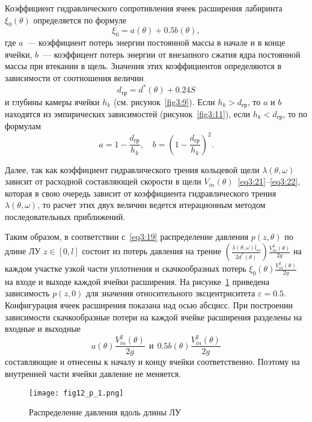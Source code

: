 Коэффициент гидравлического сопротивления ячеек расширения лабиринта $\xi_0 \left(\theta \right)$
определяется по формуле~\cite{idelchik}
\begin{equation}
  \xi _0  = a\left( \theta  \right) + 0.5b\left( \theta  \right),
  \label{eq3:23}
\end{equation}
где $a$~--- коэффициент потерь энергии постоянной массы в начале и в конце ячейки, 
$b$~--- коэффицент потерь энергии от внезапного сжатия ядра постоянной массы при втекании в щель.
Значения этих коэффициентов определяются в зависимости от соотношения величин
\begin{equation}
  d_{\text{гр}} = d^* \left(\theta \right)+0.24  S
  \label{eq3:24}
\end{equation}
и глубины камеры ячейки $h_k$ (см. рисунок~\ref{fig3:9}). Если $h_k>d_{\text{гр}}$, то $a$ и $b$ находятся 
из эмпирических зависимостей
(рисунок~\ref{fig3:11}), если $h_k<d_{\text{гр}}$, то по формулам
\begin{equation}
  a=1-\frac{d_{\text{гр}}}{h_k},\quad b=\left(1-\frac{d_{\text{гр}}}{h_k}\right)^2.
  \label{eq3:241}
\end{equation}

Далее, так как коэффициент гидравлического трения кольцевой 
щели $\lambda \left( {\theta ,\omega } \right)$ зависит от расходной составляющей
скорости в щели $V_{in} \left( \theta  \right)$~\eqref{eq3:21}--\eqref{eq3:22}, которая в свою 
очередь зависит от коэффициента гидравлического трения $\lambda \left( {\theta ,\omega } \right)$, то 
расчет этих двух величин ведется итерационным методом последовательных приближений.

Таким образом, в соответствии с~\eqref{eq3:19} распределение давления $p(z,\theta)$ 
по длине ЛУ $z\in[0,l]$ состоит из потерь давления на трение
$\left({\displaystyle\frac{{\lambda \left({\theta ,\omega}\right)l_{\text{уз}} }}
{{2d^* \left( \theta  \right)}}} \right)\displaystyle\frac{{V_{in}^2 \left(\theta \right)}}{{2g}}$
на каждом участке узкой части уплотнения и скачкообразных 
потерь $\xi _0 \left( \theta  \right)\displaystyle\frac{{V_{in}^2 \left( \theta  \right)}}{{2g}}$
на входе и выходе каждой ячейки расширения. На рисунке~\ref{fig3:12} приведена зависимость $p(z, 0)$ 
для значения относительного эксцентриситета
$\varepsilon=0.5$. Конфигурация ячеек расширения показана над осью абсцисс. При построении 
зависимости скачкообразные потери на каждой ячейке расширения разделены на входные и выходные
$$
a(\theta)\frac{V^2_{in}(\theta)}{2g}~~
\text{и}~~ 0.5b(\theta)\frac{V^2_{in}(\theta)}{2g}
$$
составляющие и отнесены к началу и концу ячейки соответственно. Поэтому на внутренней части 
ячейки давление не меняется.
\begin{figure}[t!]
  \centering
  \texttt{[image: fig12\_p\_1.png]}
  \caption{Распределение давления вдоль длины ЛУ}
  \label{fig3:12}
\end{figure}

